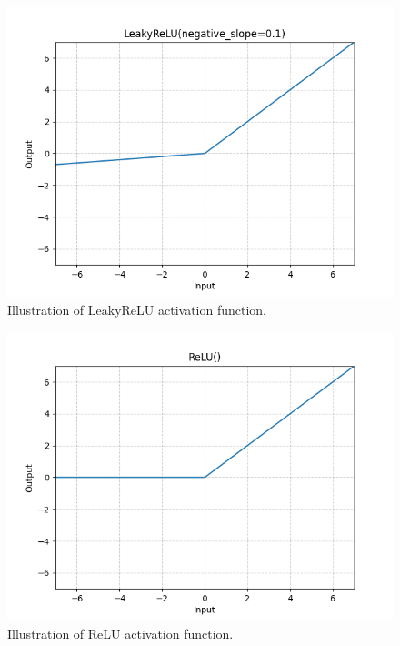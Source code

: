     \begin{figure}[H]
		\centering
		\includegraphics[scale=0.5]{img/leaky-relu.png}
		\caption{Illustration of LeakyReLU activation function.}
		\label{leaky-relu}
	\end{figure}
    \begin{figure}[H]
		\centering
		\includegraphics[scale=0.5]{img/relu.png}
		\caption{Illustration of ReLU activation function.}
		\label{relu}
	\end{figure}
